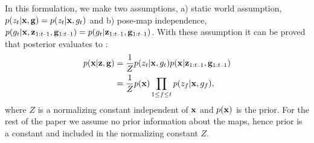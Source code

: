 \documentclass[letterpaper, 10 pt, conference]{ieeeconf} %
\begin{document}

In this formulation, we make two assumptions, a) static world assumption, $p(z_t|\mathbf{x},
\mathbf{g}) = p(z_t|\mathbf{x}, g_t)$ and b) pose-map independence,
$p(g_t|\map, \remaining) = p(g_t|\remaining)$. With these assumption it can
be proved \cite{merali2013icra} that posterior evaluates to :
\begin{align}
 p(\map | \measurements, \poses) &= \frac{1}{Z} p(z_t|\map , g_t)p(\map| \remaining)\\
                               &= \frac{1}{Z} p(\map)\prod_{1 \le f \le t}
 p(z_f|\map, g_f),
 \label{eq:map}
\end{align}
where $Z$ is a normalizing constant independent of $\mathbf{x}$ and $p(\mathbf{x})$ is
the prior. For the rest of the paper we assume no prior information about
the maps, hence prior is a constant and included in the normalizing
constant $Z$. 
\end{document}
